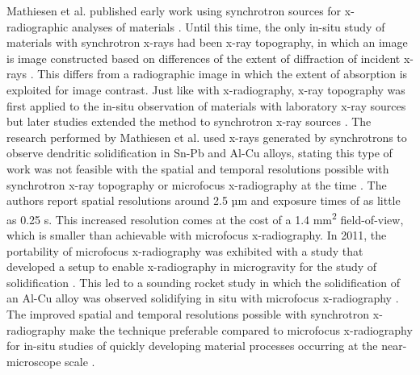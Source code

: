 Mathiesen et al. published early work using synchrotron sources for
x-radiographic analyses of materials \cite{Mathiesen1999}. Until this
time, the only in-situ study of materials with synchrotron x-rays had been
x-ray topography, in which an image is image constructed based on
differences of the extent of diffraction of incident x-rays
\cite{Lang1959}. This differs from a radiographic image in which the
extent of absorption is exploited for image contrast. Just like with
x-radiography, x-ray topography was first applied to the in-situ
observation of materials with laboratory x-ray sources \cite{Chikawa1972,
Chikawa1974, Kobayashi1984} but later studies extended the method to
synchrotron x-ray sources \cite{Yamada1987, Grange1994}. The research
performed by Mathiesen et al. used x-rays generated by synchrotrons to
observe dendritic solidification in Sn-Pb and Al-Cu alloys, stating this
type of work was not feasible with the spatial and temporal resolutions
possible with synchrotron x-ray topography or microfocus x-radiography at
the time \cite{Mathiesen1999, Mathiesen2002}. The authors report spatial
resolutions around 2.5 µm and exposure times of as little as 0.25 s. This
increased resolution comes at the cost of a 1.4 mm\textsuperscript{2}
field-of-view, which
is smaller than achievable with microfocus x-radiography. In 2011, the
portability of microfocus x-radiography was exhibited with a study that
developed a setup to enable x-radiography in microgravity for the study of
solidification \cite{Rakete2011}. This led to a sounding rocket study in
which the solidification of an Al-Cu alloy was observed solidifying in situ
with microfocus x-radiography \cite{Nguyen2013}.
The improved spatial and temporal resolutions possible with synchrotron
x-radiography make the technique preferable compared to microfocus
x-radiography for in-situ studies of quickly developing material processes
occurring at the near-microscope scale
\cite{Nguyen2003, Husseini2008, Clarke2015}.

